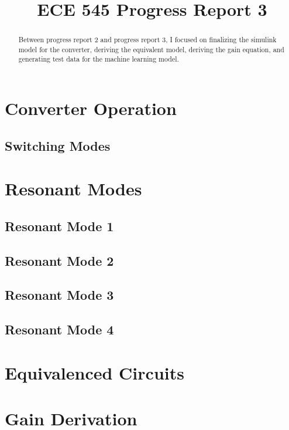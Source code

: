 \documentclass[conference]{IEEEtran}
\begin{document}
\title{ECE 545 Progress Report 3}

\author{
}

\maketitle

\begin{abstract}
Between progress report 2 and progress report 3, I focused on finalizing the simulink model for the converter, deriving the equivalent model, deriving the gain equation, and generating test data for the machine learning model.

\end{abstract}

\section{Converter Operation}



\subsection{Switching Modes}


\section{Resonant Modes}


\subsection{Resonant Mode 1}

\subsection{Resonant Mode 2}

\subsection{Resonant Mode 3}

\subsection{Resonant Mode 4}

\section{Equivalenced Circuits}

\section{Gain Derivation}

%
\end{document}
